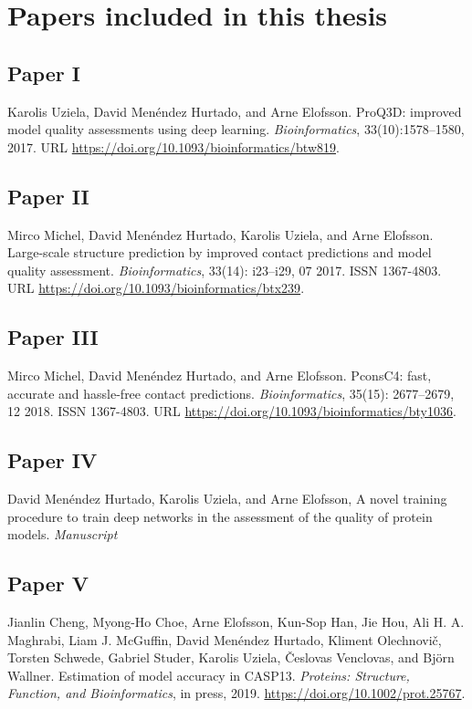\chapter*{Papers included in this thesis}

\section*{Paper \textcolor[cmyk]{0, 0.87, 0.68, 0.32}{I}}
Karolis Uziela, David Menéndez Hurtado, and Arne Elofsson.
ProQ3D: improved model quality assessments using deep learning. \textit{Bioinformatics}, 33(10):1578–1580, 2017.
URL \url{ https://doi.org/10.1093/bioinformatics/btw819}.

\section*{Paper  \textcolor[cmyk]{0, 0.87, 0.68, 0.32}{II}}
Mirco Michel, David Menéndez Hurtado, Karolis Uziela, and Arne Elofsson.
Large-scale structure
prediction by improved contact predictions and model quality assessment. \textit{Bioinformatics}, 33(14):
i23–i29, 07 2017. ISSN 1367-4803. URL
\url{https://doi.org/10.1093/bioinformatics/btx239}.


\section*{Paper \textcolor[cmyk]{0, 0.87, 0.68, 0.32}{III}}
Mirco Michel, David Menéndez Hurtado, and Arne Elofsson. PconsC4: fast, accurate and hassle-free
contact predictions. \textit{Bioinformatics}, 35(15): 2677–2679, 12 2018. ISSN 1367-4803. URL \url{https://doi.org/10.1093/bioinformatics/bty1036}.


\section*{Paper \textcolor[cmyk]{0, 0.87, 0.68, 0.32}{IV}}
David Menéndez Hurtado, Karolis Uziela, and Arne Elofsson, A novel training procedure to train deep networks in the assessment of the quality of protein models. \emph{Manuscript}


\section*{Paper \textcolor[cmyk]{0, 0.87, 0.68, 0.32}{V}}

Jianlin Cheng, Myong-Ho Choe, Arne Elofsson, Kun-Sop Han, Jie Hou, Ali H. A. Maghrabi, Liam J.
McGuffin, David Menéndez Hurtado, Kliment Olechnovič, Torsten Schwede, Gabriel Studer, Karolis
Uziela, Česlovas Venclovas, and Björn Wallner. Estimation of model accuracy in CASP13. \emph{Proteins:
Structure, Function, and Bioinformatics}, in press, 2019. \url{https://doi.org/10.1002/prot.25767}.

